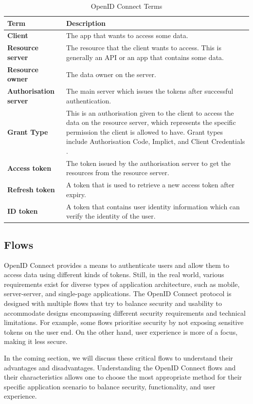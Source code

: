 \begingroup
\centering
\setlength{\tabcolsep}{6.5pt} %
\begin{longtable}{|p{4cm}|p{10cm}|}
\caption{OpenID Connect Terms}
    \label{table:oauth_terms}
\hline
\rowcolor{grey!15}
\textbf{Term} & \textbf{Description} \\ 
\hline

\textbf{Client} & The app that wants to access some data. \\ \hline
\textbf{Resource server} & The resource that the client wants to access. This is generally an API or an app that contains some data. \\ \hline
\textbf{Resource owner} & The data owner on the server. \\ \hline
\textbf{Authorisation server} & The main server which issues the tokens after successful authentication.\\ \hline
\textbf{Grant Type} & This is an authorisation given to the client to access the data on the resource server, which represents the specific permission the client is allowed to have. Grant types include Authorisation Code, Implict, and Client Credentials \citep{adv_api_sec}.  \\ \hline
\textbf{Access token} & The token issued by the authorisation server to get the resources from the resource server. \\ \hline
\textbf{Refresh token} & A token that is used to retrieve a new access token after expiry. \\ \hline
\textbf{ID token} & A token that contains user identity information which can verify the identity of the user. \\ \hline
\end{longtable}
\endgroup

\subsection{Flows}
OpenID Connect provides a means to authenticate users and allow them to access data using different kinds of tokens. Still, in the real world, various requirements exist for diverse types of application architecture, such as mobile, server-server, and single-page applications. The OpenID Connect protocol is designed with multiple flows that try to balance security and usability to accommodate designs encompassing different security requirements and technical limitations. For example, some flows prioritise security by not exposing sensitive tokens on the user end. On the other hand, user experience is more of a focus, making it less secure. 
\par
In the coming section, we will discuss these critical flows to understand their advantages and disadvantages. Understanding the OpenID Connect flows and their characteristics allows one to choose the most appropriate method for their specific application scenario to balance security, functionality, and user experience.



